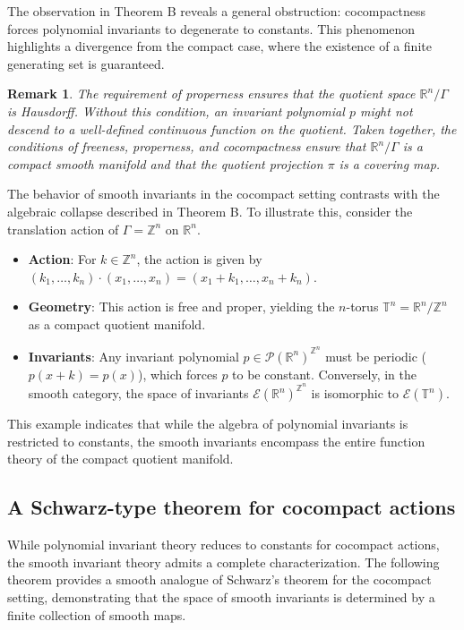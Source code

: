 \documentclass[]{article}
\newtheorem{remark}[theorem]{Remark}
\begin{document}
The observation in Theorem B reveals a general obstruction: cocompactness forces polynomial invariants to degenerate to constants. This phenomenon highlights a divergence from the compact case, where the existence of a finite generating set is guaranteed.

\begin{remark}
	The requirement of properness ensures that the quotient space $\mathbb{R}^n/\Gamma$ is Hausdorff. Without this condition, an invariant polynomial $p$ might not descend to a well-defined continuous function on the quotient. Taken together, the conditions of freeness, properness, and cocompactness ensure that $\mathbb{R}^n/\Gamma$ is a compact smooth manifold and that the quotient projection $\pi$ is a covering map.
\end{remark}

The behavior of smooth invariants in the cocompact setting contrasts with the algebraic collapse described in Theorem B. To illustrate this, consider the translation action of $\Gamma = \mathbb{Z}^n$ on $\mathbb{R}^n$.
\begin{itemize}
		\item \textbf{Action}: For $k \in \mathbb{Z}^n$, the action is given by $(k_1, \dots, k_n) \cdot (x_1, \dots, x_n) = (x_1 + k_1, \dots, x_n + k_n)$.
		\item \textbf{Geometry}: This action is free and proper, yielding the $n$-torus $\mathbb{T}^n = \mathbb{R}^n/\mathbb{Z}^n$ as a compact quotient manifold.
		\item \textbf{Invariants}: Any invariant polynomial $p \in \mathcal{P}(\mathbb{R}^n)^{\mathbb{Z}^n}$ must be periodic ($p(x+k) = p(x)$), which forces $p$ to be constant. Conversely, in the smooth category, the space of invariants $\mathcal{E}(\mathbb{R}^n)^{\mathbb{Z}^n}$ is isomorphic to $\mathcal{E}(\mathbb{T}^n)$.
\end{itemize}

This example indicates that while the algebra of polynomial invariants is restricted to constants, the smooth invariants encompass the entire function theory of the compact quotient manifold.


\subsection{A Schwarz-type theorem for cocompact actions}

While polynomial invariant theory reduces to constants for cocompact actions, the smooth invariant theory admits a complete characterization. The following theorem provides a smooth analogue of Schwarz's theorem for the cocompact setting, demonstrating that the space of smooth invariants is determined by a finite collection of smooth maps.
\end{document}
